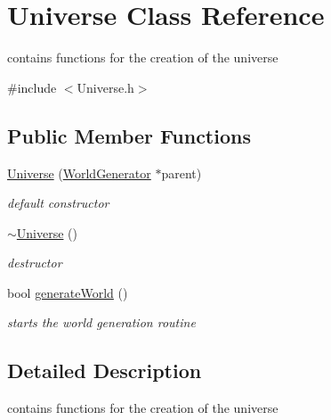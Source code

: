 \hypertarget{class_universe}{\section{Universe Class Reference}
\label{class_universe}
}


contains functions for the creation of the universe  




{\ttfamily \#include $<$Universe.\-h$>$}

\subsection*{Public Member Functions}
\begin{DoxyCompactItemize}
\item 
\hyperlink{class_universe_ab32ddf8f3797e862f9aa89528c877bc8}{Universe} (\hyperlink{class_world_generator}{World\-Generator} $\ast$parent)
\begin{DoxyCompactList}\small\item\em default constructor \end{DoxyCompactList}\item 
\hypertarget{class_universe_a7723438c7fa497defb4c82ac975152b2}{\hyperlink{class_universe_a7723438c7fa497defb4c82ac975152b2}{$\sim$\-Universe} ()}\label{class_universe_a7723438c7fa497defb4c82ac975152b2}

\begin{DoxyCompactList}\small\item\em destructor \end{DoxyCompactList}\item 
bool \hyperlink{class_universe_a63952bfc2e82fa942883ddf7266bec38}{generate\-World} ()
\begin{DoxyCompactList}\small\item\em starts the world generation routine \end{DoxyCompactList}\end{DoxyCompactItemize}


\subsection{Detailed Description}
contains functions for the creation of the universe 

